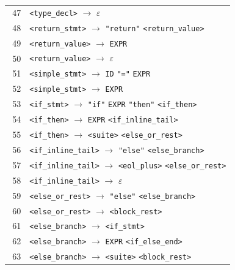 \documentclass[11pt,a4paper]{article}
\begin{document}
\begin{longtable}{@{}r@{\quad}>{\raggedright\arraybackslash}p{0.91\linewidth}@{}}
47 & \texttt{\textless{}type\_decl\textgreater{}} $\rightarrow$ $\varepsilon$ \\
48 & \texttt{\textless{}return\_stmt\textgreater{}} $\rightarrow$ \texttt{"return"} \texttt{\textless{}return\_value\textgreater{}} \\
49 & \texttt{\textless{}return\_value\textgreater{}} $\rightarrow$ \texttt{EXPR} \\
50 & \texttt{\textless{}return\_value\textgreater{}} $\rightarrow$ $\varepsilon$ \\
51 & \texttt{\textless{}simple\_stmt\textgreater{}} $\rightarrow$ \texttt{ID} \texttt{"="} \texttt{EXPR} \\
52 & \texttt{\textless{}simple\_stmt\textgreater{}} $\rightarrow$ \texttt{EXPR} \\
53 & \texttt{\textless{}if\_stmt\textgreater{}} $\rightarrow$ \texttt{"if"} \texttt{EXPR} \texttt{"then"} \texttt{\textless{}if\_then\textgreater{}} \\
54 & \texttt{\textless{}if\_then\textgreater{}} $\rightarrow$ \texttt{EXPR} \texttt{\textless{}if\_inline\_tail\textgreater{}} \\
55 & \texttt{\textless{}if\_then\textgreater{}} $\rightarrow$ \texttt{\textless{}suite\textgreater{}} \texttt{\textless{}else\_or\_rest\textgreater{}} \\
56 & \texttt{\textless{}if\_inline\_tail\textgreater{}} $\rightarrow$ \texttt{"else"} \texttt{\textless{}else\_branch\textgreater{}} \\
57 & \texttt{\textless{}if\_inline\_tail\textgreater{}} $\rightarrow$ \texttt{\textless{}eol\_plus\textgreater{}} \texttt{\textless{}else\_or\_rest\textgreater{}} \\
58 & \texttt{\textless{}if\_inline\_tail\textgreater{}} $\rightarrow$ $\varepsilon$ \\
59 & \texttt{\textless{}else\_or\_rest\textgreater{}} $\rightarrow$ \texttt{"else"} \texttt{\textless{}else\_branch\textgreater{}} \\
60 & \texttt{\textless{}else\_or\_rest\textgreater{}} $\rightarrow$ \texttt{\textless{}block\_rest\textgreater{}} \\
61 & \texttt{\textless{}else\_branch\textgreater{}} $\rightarrow$ \texttt{\textless{}if\_stmt\textgreater{}} \\
62 & \texttt{\textless{}else\_branch\textgreater{}} $\rightarrow$ \texttt{EXPR} \texttt{\textless{}if\_else\_end\textgreater{}} \\
63 & \texttt{\textless{}else\_branch\textgreater{}} $\rightarrow$ \texttt{\textless{}suite\textgreater{}} \texttt{\textless{}block\_rest\textgreater{}} \\

\end{longtable}
\end{document}
